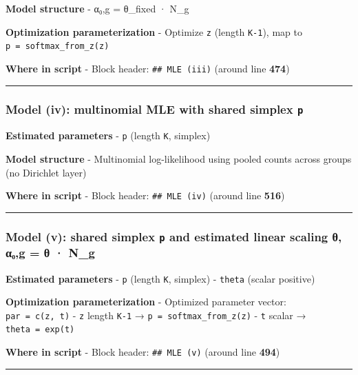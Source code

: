 \documentclass[
]{article}
\begin{document}
\textbf{Model structure} - α₀,g = θ\_fixed · N\_g

\textbf{Optimization parameterization} - Optimize \texttt{z} (length
\texttt{K-1}), map to \texttt{p\ =\ softmax\_from\_z(z)}

\textbf{Where in script} - Block header: \texttt{\#\#\ MLE\ (iii)}
(around line \textbf{474})

\begin{center}\rule{0.5\linewidth}{0.5pt}\end{center}

\subsubsection{\texorpdfstring{Model (iv): multinomial MLE with shared
simplex
\texttt{p}}{Model (iv): multinomial MLE with shared simplex p}}\label{model-iv-multinomial-mle-with-shared-simplex-p}

\textbf{Estimated parameters} - \texttt{p} (length \texttt{K}, simplex)

\textbf{Model structure} - Multinomial log-likelihood using pooled
counts across groups (no Dirichlet layer)

\textbf{Where in script} - Block header: \texttt{\#\#\ MLE\ (iv)}
(around line \textbf{516})

\begin{center}\rule{0.5\linewidth}{0.5pt}\end{center}

\subsubsection{\texorpdfstring{Model (v): shared simplex \texttt{p} and
estimated linear scaling θ, α₀,g = θ ·
N\_g}{Model (v): shared simplex p and estimated linear scaling θ, α₀,g = θ · N\_g}}\label{model-v-shared-simplex-p-and-estimated-linear-scaling-ux3b8-ux3b1ux2080g-ux3b8-n_g}

\textbf{Estimated parameters} - \texttt{p} (length \texttt{K}, simplex)
- \texttt{theta} (scalar positive)

\textbf{Optimization parameterization} - Optimized parameter vector:
\texttt{par\ =\ c(z,\ t)} - \texttt{z} length \texttt{K-1} →
\texttt{p\ =\ softmax\_from\_z(z)} - \texttt{t} scalar →
\texttt{theta\ =\ exp(t)}

\textbf{Where in script} - Block header: \texttt{\#\#\ MLE\ (v)} (around
line \textbf{494})

\begin{center}\rule{0.5\linewidth}{0.5pt}\end{center}
\end{document}

